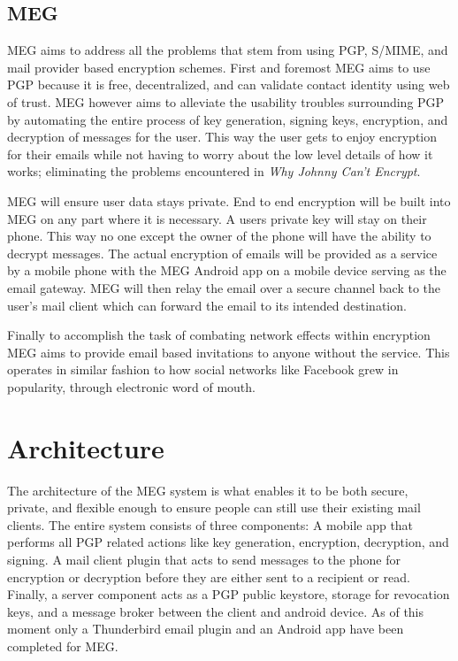 \documentclass[10pt]{article}
\begin{document}
\begin{multicols}{2}
\subsection{MEG}
\par MEG aims to address all the problems that stem from using PGP, S/MIME, and mail provider based encryption schemes. First and foremost MEG aims to use PGP because it is free, decentralized, and can validate contact identity using web of trust. MEG however aims to alleviate the usability troubles surrounding PGP by automating the entire process of key generation, signing keys, encryption, and decryption of messages for the user. This way the user gets to enjoy encryption for their emails while not having to worry about the low level details of how it works; eliminating the problems encountered in \textit{Why Johnny Can't Encrypt}\cite{whitten1999johnny}.
\par MEG will ensure user data stays private. End to end encryption will be built into MEG on any part where it is necessary. A users private key will stay on their phone. This way no one except the owner of the phone will have the ability to decrypt messages. The actual encryption of emails will be provided as a service by a mobile phone with the MEG Android app on a mobile device serving as the email gateway. MEG will then relay the email over a secure channel back to the user's mail client which can forward the email to its intended destination.
\par Finally to accomplish the task of combating network effects within encryption MEG aims to provide email based invitations to anyone without the service. This operates in similar fashion to how social networks like Facebook grew in popularity, through electronic word of mouth\cite{trusov2009effects}.

\section{Architecture}
\par The architecture of the MEG system is what enables it to be both secure, private, and flexible enough to ensure people can still use their existing mail clients. The entire system consists of three components: A mobile app that performs all PGP related actions like key generation, encryption, decryption, and signing. A mail client plugin that acts to send messages to the phone for encryption or decryption before they are either sent to a recipient or read. Finally, a server component acts as a PGP public keystore, storage for revocation keys, and a message broker between the client and android device. As of this moment only a Thunderbird email plugin and an Android app have been completed for MEG.
\end{multicols}
\end{document}
